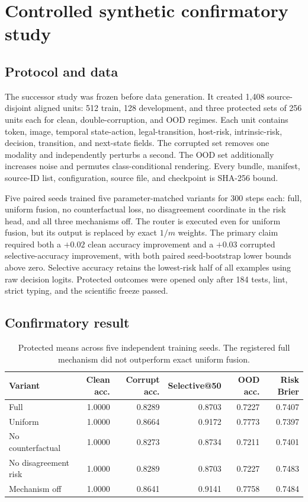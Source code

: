 \documentclass[10pt]{article}
\begin{document}
\section{Controlled synthetic confirmatory study}
\subsection{Protocol and data}
The successor study was frozen before data generation. It created 1,408 source-disjoint
aligned units: 512 train, 128 development, and three protected sets of 256 units each for
clean, double-corruption, and OOD regimes. Each unit contains token, image, temporal
state-action, legal-transition, host-risk, intrinsic-risk, decision, transition, and
next-state fields. The corrupted set removes one modality and independently perturbs a
second. The OOD set additionally increases noise and permutes class-conditional rendering.
Every bundle, manifest, source-ID list, configuration, source file, and checkpoint is
SHA-256 bound.

Five paired seeds trained five parameter-matched variants for 300 steps each: full,
uniform fusion, no counterfactual loss, no disagreement coordinate in the risk head, and
all three mechanisms off. The router is executed even for uniform fusion, but its output
is replaced by exact $1/m$ weights. The primary claim required both a $+0.02$ clean
accuracy improvement and a $+0.03$ corrupted selective-accuracy improvement, with both
paired seed-bootstrap lower bounds above zero. Selective accuracy retains the lowest-risk
half of all examples using raw decision logits. Protected outcomes were opened only after
184 tests, lint, strict typing, and the scientific freeze passed.

\subsection{Confirmatory result}
\begin{table}[H]
\centering
\small
\begin{tabular}{lrrrrr}
\toprule
Variant & Clean acc. & Corrupt acc. & Selective@50 & OOD acc. & Risk Brier\\
\midrule
Full & 1.0000 & 0.8289 & 0.8703 & 0.7227 & 0.7407\\
Uniform & 1.0000 & 0.8664 & 0.9172 & 0.7773 & 0.7397\\
No counterfactual & 1.0000 & 0.8273 & 0.8734 & 0.7211 & 0.7401\\
No disagreement risk & 1.0000 & 0.8289 & 0.8703 & 0.7227 & 0.7483\\
Mechanism off & 1.0000 & 0.8641 & 0.9141 & 0.7758 & 0.7484\\
\bottomrule
\end{tabular}
\caption{Protected means across five independent training seeds. The registered full
mechanism did not outperform exact uniform fusion.}
\label{tab:controlled}
\end{table}
\end{document}
